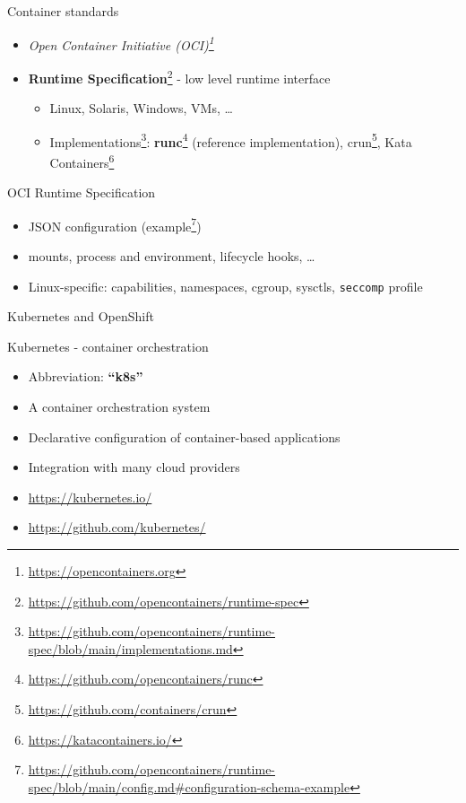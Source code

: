 \documentclass[ignorenonframetext,aspectratio=169,12pt]{beamer}
\begin{document}
\begin{frame}{Container standards}
\protect\hypertarget{container-standards}{}
\begin{itemize}
    \item {\em Open Container Initiative (OCI)\footnote{\url{https://opencontainers.org}}}
    \item {\bf Runtime Specification}\footnote{\url{https://github.com/opencontainers/runtime-spec}} - low level runtime interface
    \begin{itemize}
        \item Linux, Solaris, Windows, VMs, \ldots{}
        \item Implementations\footnote{\url{https://github.com/opencontainers/runtime-spec/blob/main/implementations.md}}:
          {\bf runc}\footnote{\url{https://github.com/opencontainers/runc}} (reference implementation),
          crun\footnote{\url{https://github.com/containers/crun}},
          Kata Containers\footnote{\url{https://katacontainers.io/}}
    \end{itemize}
\end{itemize}
\end{frame}

\begin{frame}{OCI Runtime Specification}
\protect\hypertarget{oci-runtime-spec}{}
\begin{itemize}

\item JSON configuration (example\footnote{\url{https://github.com/opencontainers/runtime-spec/blob/main/config.md\#configuration-schema-example}})

\item mounts, process and environment, lifecycle hooks, \ldots{}

\item Linux-specific: capabilities, namespaces, cgroup, sysctls,
      {\tt seccomp} profile

\end{itemize}

\end{frame}



\begin{frame}[plain]
\centering
\huge Kubernetes and OpenShift
\end{frame}


\begin{frame}{Kubernetes - container orchestration}
\protect\hypertarget{kubernetes-intro}{}

\begin{itemize}
\item Abbreviation: {\bf ``k8s''}
\item A container orchestration system
\item Declarative configuration of container-based applications
\item Integration with many cloud providers
\item \url{https://kubernetes.io/}
\item \url{https://github.com/kubernetes/}
\end{itemize}

\end{frame}
\end{document}
